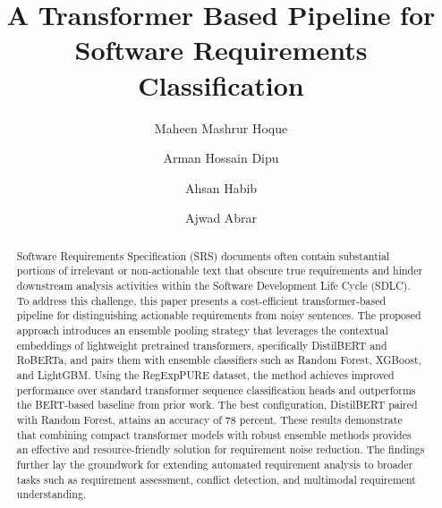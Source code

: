 \documentclass[sigconf,review]{acmart}
\begin{document}
\title{A Transformer Based Pipeline for Software Requirements Classification}


\author{Maheen Mashrur Hoque}

\author{Arman Hossain Dipu}

\author{Ahsan Habib}

\author{Ajwad Abrar}

\begin{abstract}
Software Requirements Specification (SRS) documents often contain substantial portions of irrelevant or non-actionable text that obscure true requirements and hinder downstream analysis activities within the Software Development Life Cycle (SDLC). To address this challenge, this paper presents a cost-efficient transformer-based pipeline for distinguishing actionable requirements from noisy sentences. The proposed approach introduces an ensemble pooling strategy that leverages the contextual embeddings of lightweight pretrained transformers, specifically DistilBERT and RoBERTa, and pairs them with ensemble classifiers such as Random Forest, XGBoost, and LightGBM. Using the RegExpPURE dataset, the method achieves improved performance over standard transformer sequence classification heads and outperforms the BERT-based baseline from prior work. The best configuration, DistilBERT paired with Random Forest, attains an accuracy of 78 percent. These results demonstrate that combining compact transformer models with robust ensemble methods provides an effective and resource-friendly solution for requirement noise reduction. The findings further lay the groundwork for extending automated requirement analysis to broader tasks such as requirement assessment, conflict detection, and multimodal requirement understanding.

\end{abstract}
\end{document}
